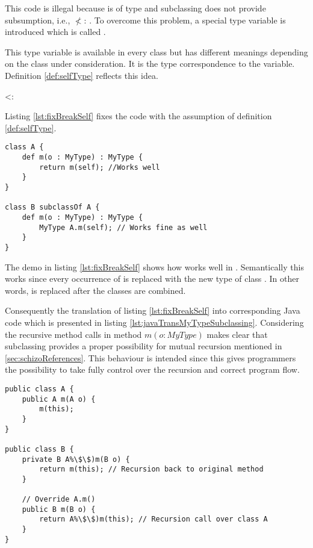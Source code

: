 This code is illegal because \self is of type \B and subclassing does
not provide subsumption, i.e., \B $\nless$: \A. To overcome this problem,
a special type variable is introduced which is called \mytype.

This type variable is available in every class but has different meanings
depending on the class under consideration. It is the type correspondence
to the \self variable. Definition \ref{def:selfType} reflects this idea.

\begin{defn}
	\label{def:selfType}
	\self <: \mytype
\end{defn}

Listing \ref{lst:fixBreakSelf} fixes the code with the assumption of
definition \ref{def:selfType}.

\begin{lstlisting}[float,language=ooplss,caption=Type safe code with \mytype,label=lst:fixBreakSelf]
class A {
	def m(o : MyType) : MyType {
		return m(self); //Works well
	}
}

class B subclassOf A {
	def m(o : MyType) : MyType {
		MyType A.m(self); // Works fine as well
	}
}
\end{lstlisting}

The demo in listing \ref{lst:fixBreakSelf} shows how \mytype works well
in \ooplss.  Semantically this works since every occurrence of \mytype
is replaced with the new type of class \B. In other words, \mytype is
replaced after the classes are combined.

Consequently the translation of listing \ref{lst:fixBreakSelf}
into corresponding Java code which is presented in listing
\ref{lst:javaTransMyTypeSubclassing}. Considering the recursive
method calls in method $m(o : MyType)$ makes clear that subclassing
provides a proper possibility for mutual recursion mentioned in
\cref{sec:schizoReferences}. This behaviour is intended since this gives
programmers the possibility to take fully control over the recursion
and correct program flow.

\begin{lstlisting}[float,caption=Subclassing with \mytype translated in Java,label=lst:javaTransMyTypeSubclassing]
public class A {
	public A m(A o) {
		m(this);
	}
}

public class B {
	private B A%\$\$)m(B o) {
		return m(this); // Recursion back to original method
	}

	// Override A.m()
	public B m(B o) {
		return A%\$\$)m(this); // Recursion call over class A
	}
}
\end{lstlisting}


